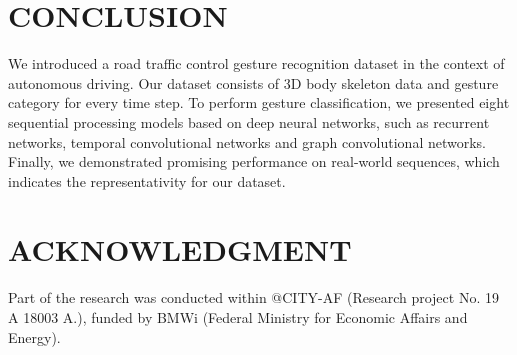 \documentclass[letterpaper, 10 pt, conference]{ieeeconf}
\begin{document}
\section{CONCLUSION}

We introduced a road traffic control gesture recognition dataset in the context of autonomous driving. Our dataset consists of 3D body skeleton data and gesture category for every time step. To perform gesture classification, we presented eight sequential processing models based on deep neural networks, such as recurrent networks, temporal convolutional networks and graph convolutional networks. Finally, we demonstrated promising performance on real-world sequences, which indicates the representativity for our dataset.









\section*{ACKNOWLEDGMENT}
Part of the research was conducted within @CITY-AF (Research project No. 19 A 18003 A.), funded by BMWi (Federal Ministry for Economic Affairs and Energy).




\end{document}

